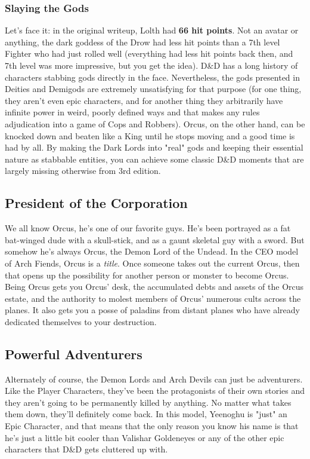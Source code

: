 \subsubsection{Slaying the Gods}

Let's face it: in the original writeup, Lolth had \textbf{66 hit points}. Not an avatar or anything, the dark goddess of the Drow had less hit points than a 7th level Fighter who had just rolled well (everything had less hit points back then, and 7th level was more impressive, but you get the idea). D\&D has a long history of characters stabbing gods directly in the face. Nevertheless, the gods presented in Deities and Demigods are extremely unsatisfying for that purpose (for one thing, they aren't even epic characters, and for another thing they arbitrarily have infinite power in weird, poorly defined ways and that makes any rules adjudication into a game of Cops and Robbers). Orcus, on the other hand, can be knocked down and beaten like a King until he stops moving and a good time is had by all. By making the Dark Lords into "real" gods and keeping their essential nature as stabbable entities, you can achieve some classic D\&D moments that are largely missing otherwise from 3rd edition.

\subsection{President of the Corporation}
\vspace*{-8pt}

We all know Orcus, he's one of our favorite guys. He's been portrayed as a fat bat-winged dude with a skull-stick, and as a gaunt skeletal guy with a sword. But somehow he's always Orcus, the Demon Lord of the Undead. In the CEO model of Arch Fiends, Orcus is a \textit{title}. Once someone takes out the current Orcus, then that opens up the possibility for another person or monster to become Orcus. Being Orcus gets you Orcus' desk, the accumulated debts and assets of the Orcus estate, and the authority to molest members of Orcus' numerous cults across the planes. It also gets you a posse of paladins from distant planes who have already dedicated themselves to your destruction.

\subsection{Powerful Adventurers}

Alternately of course, the Demon Lords and Arch Devils can just be adventurers. Like the Player Characters, they've been the protagonists of their own stories and they aren't going to be permanently killed by anything. No matter what takes them down, they'll definitely come back. In this model, Yeenoghu is "just" an Epic Character, and that means that the only reason you know his name is that he's just a little bit cooler than Valishar Goldeneyes or any of the other epic characters that D\&D gets cluttered up with.

